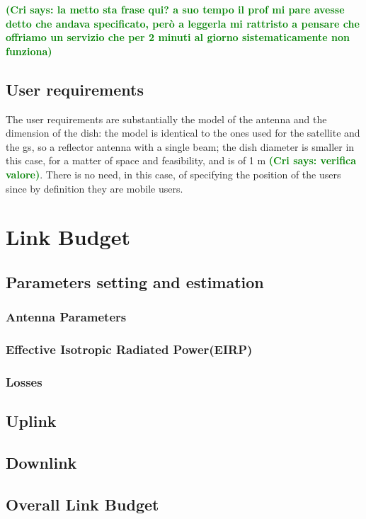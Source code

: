 \documentclass[11pt,a4paper,titlepage]{article}
\newcommand{\cri}[1]{\textcolor{green}{\textbf{(Cri says: #1)}}}
\begin{document}
\cri{la metto sta frase qui? a suo tempo il prof mi pare avesse detto che andava specificato, però a leggerla mi rattristo a pensare che offriamo un servizio che per 2 minuti al giorno sistematicamente non funziona}
	\subsection{User requirements}
The user requirements are substantially the model of the antenna and the dimension of the dish: the model is identical to the ones used for the satellite and the \gls{gs}, so a reflector antenna with a single beam; the dish diameter is smaller in this case, for a matter of space and feasibility, and is of 1 m \cri{verifica valore}. There is no need, in this case, of specifying the position of the users since by definition they are mobile users.

\section{Link Budget}
	\subsection{Parameters setting and estimation}
		\subsubsection{Antenna Parameters}
		\subsubsection{Effective Isotropic Radiated Power(EIRP)}
		\subsubsection{Losses}
	\subsection{Uplink}
	\subsection{Downlink}
	\subsection{Overall Link Budget}
\lipsum[1]
\end{document}
